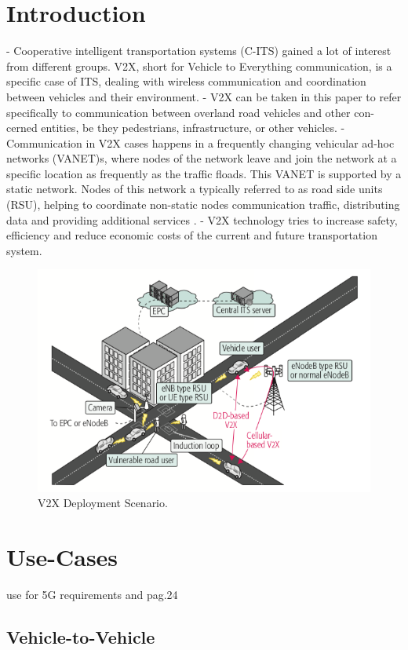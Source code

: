 \documentclass[conference,12pt,onecolumn]{IEEEtran}
\begin{document}
\section{Introduction}
- Cooperative intelligent transportation systems (C-ITS) gained a lot of interest from different groups. V2X, short for Vehicle to Everything communication, is a specific case of ITS, dealing with wireless communication and coordination between vehicles and their environment.
- V2X can be taken in this paper to refer specifically to communication between overland road vehicles and other con- cerned entities, be they pedestrians, infrastructure, or other vehicles. \cite{machardy2018}
- Communication in V2X cases happens in a frequently changing vehicular ad-hoc networks (VANET)s, where nodes of the network leave and join the network at a specific location as frequently as the traffic floads. This VANET is supported by a static network. Nodes of this network a typically referred to as road side units (RSU), helping to coordinate non-static nodes communication traffic, distributing data and providing additional services \cite{machardy2018}.
- V2X technology tries to increase safety, efficiency and reduce economic costs of the current and future transportation system. \cite{machardy2018}

\begin{figure} [ht]
   \centering
   \includegraphics[width=0.7\linewidth]{_Graphics/v2x_deployment_example.png}
  \caption{V2X Deployment Scenario. \cite{seo2016}}
  \label{fig:v2x_deployment_example}
\end{figure}

\section{Use-Cases} use \cite{boban2017} for 5G requirements and \cite{5gamericas2018} pag.24
\subsection{Vehicle-to-Vehicle}
\end{document}
